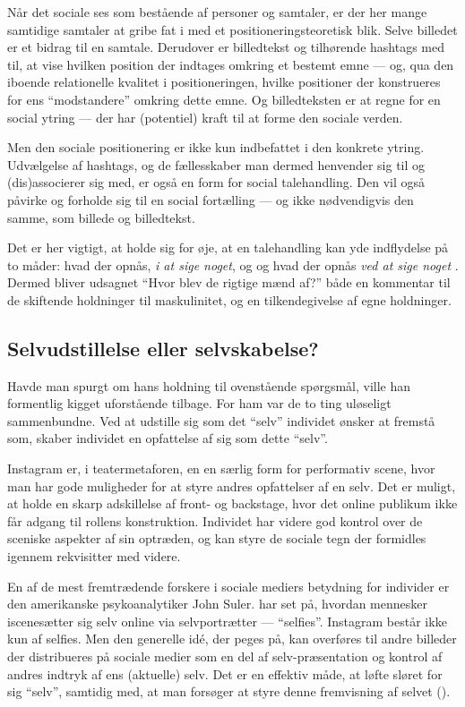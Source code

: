 Når det sociale ses som bestående af personer og samtaler, er der 
her mange samtidige samtaler at gribe fat i med et 
positioneringsteoretisk blik. Selve billedet er et bidrag til en 
samtale. Derudover er billedtekst og tilhørende hashtags med til, 
at vise hvilken position der indtages omkring et bestemt emne — 
og, qua den iboende relationelle kvalitet i positioneringen, 
hvilke positioner der konstrueres for ens “modstandere” omkring 
dette emne. Og billedteksten er at regne for en social ytring — 
der har (potentiel) kraft til at forme den sociale verden.

Men den sociale positionering er ikke kun indbefattet i den 
konkrete ytring. Udvælgelse af hashtags, og de fællesskaber man 
dermed henvender sig til og (dis)associerer sig med, er også en 
form for social talehandling. Den vil også påvirke og forholde sig 
til en social fortælling — og ikke nødvendigvis den samme, som 
billede og billedtekst.

Det er her vigtigt, at holde sig for øje, at en talehandling kan 
yde indflydelse på to måder: hvad der opnås, \emph{i at sige 
noget}, og og hvad der opnås \emph{ved at sige noget} \autocite[s.
17]{harrePositioningTheoryMoral1999}. Dermed bliver udsagnet “Hvor
blev de rigtige mænd af?” både en kommentar til de skiftende 
holdninger til maskulinitet, og en tilkendegivelse af egne 
holdninger.

\subsection{Selvudstillelse eller selvskabelse?}

Havde man spurgt \citeauthor{goffmanPresentationSelfEveryday1956} 
om hans holdning til ovenstående spørgsmål, ville han formentlig 
kigget uforstående tilbage. For ham var de to ting uløseligt 
sammenbundne. Ved at udstille sig som det “selv” individet ønsker 
at fremstå som, skaber individet en opfattelse af sig som dette 
“selv”.

Instagram er, i teatermetaforen, en en særlig form for performativ 
scene, hvor man har gode muligheder for at styre andres 
opfattelser af en selv. Det er muligt, at holde en skarp 
adskillelse af front- og backstage, hvor det online publikum ikke 
får adgang til rollens konstruktion. Individet har videre god 
kontrol over de sceniske aspekter af sin optræden, og kan styre de 
sociale tegn der formidles igennem rekvisitter med videre. 

En af de mest fremtrædende forskere i sociale mediers betydning
for individer er den amerikanske psykoanalytiker John Suler. 
\citeauthor{sulerSelfPortraitsSelfies2015} har set på, hvordan 
mennesker iscenesætter sig selv online via selvportrætter — 
“selfies”. Instagram består ikke kun af selfies. Men den generelle 
idé, der peges på, kan overføres til andre billeder der 
distribueres på sociale medier som en del af selv-præsentation og
kontrol af andres indtryk af ens (aktuelle) selv. Det er en
effektiv måde, at løfte sløret for sig “selv”, samtidig med, at
man forsøger at styre denne fremvisning af selvet 
(\citeyear{sulerSelfPortraitsSelfies2015}).


